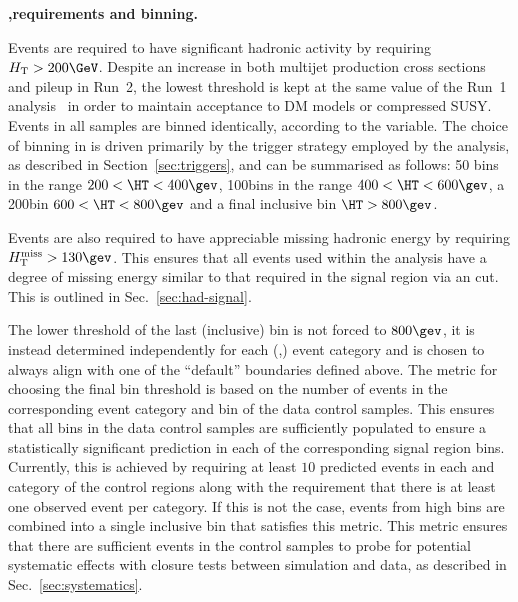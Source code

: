 {\bf \HT,\mht requirements and binning.} 

Events are required to have significant hadronic activity by requiring
$\scalht > 200\GeV$. Despite an increase in both multijet production
cross sections and pileup in Run~2, the lowest \HT threshold is
kept at the same value of the Run~1 analysis~\cite{Chatrchyan:2013lya}
in order to maintain acceptance to DM models or compressed
SUSY. Events in all samples are binned identically, according to the
\HT variable. The choice of binning in \HT is driven primarily by the
trigger strategy employed by the analysis, as described in
Section~\ref{sec:triggers}, and can be summarised as follows: 50\gev
bins in the range $200 < \HT < 400\gev$, 100\gev bins in the range
$400 < \HT < 600\gev$, a 200\gev bin $600<\HT<800\gev$ and a final 
inclusive bin $\HT > 800\gev$.

Events are also required to have appreciable missing hadronic energy
by requiring $\mht>130\gev$. This ensures that all events used within
the analysis have a degree of missing energy similar to that required
in the signal region via an \alphat cut. This is outlined in
Sec.~\ref{sec:had-signal}. 

The lower threshold of the last (inclusive) \HT bin is not forced to
$800\gev$, it is instead determined
independently for each (\njet,\nb) event category and is chosen to
always align with one of the ``default'' boundaries defined above. The
metric for choosing the final bin threshold is based on the number of
events in the corresponding event category and \HT bin of the data
control samples. This ensures that all bins in the data control
samples are sufficiently populated to ensure a statistically
significant prediction in each of the corresponding signal region
bins. Currently, this is achieved by requiring at least $10$ predicted
events in each \HT and \njet category of the control regions
along with the requirement that there is at least one observed
event per \nb category. If this is not the case, events from high \HT bins are combined
into a single inclusive bin that satisfies this metric. This metric
ensures that there are sufficient events in the control samples
to probe for potential systematic effects with closure tests between
simulation and data, as described in Sec.~\ref{sec:systematics}.

